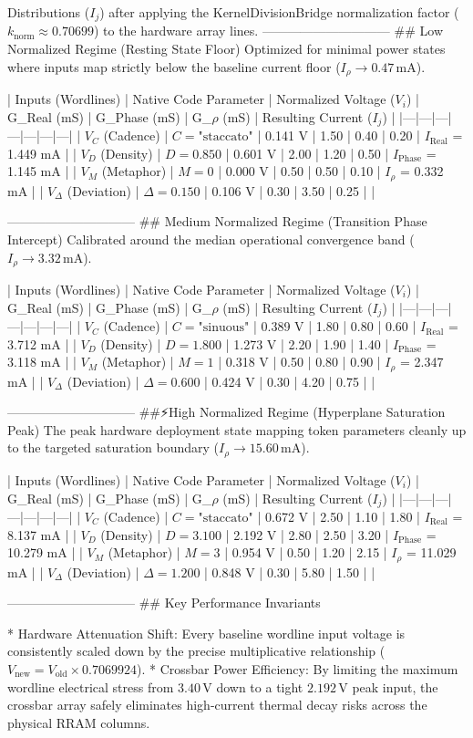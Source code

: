Distributions ($I_j$) after applying the KernelDivisionBridge normalization factor ($k_{\text{norm}} \approx 0.70699$) to the hardware array lines.
------------------------------
## Low Normalized Regime (Resting State Floor)
Optimized for minimal power states where inputs map strictly below the baseline current floor ($I_{\rho} \to 0.47\,\text{mA}$).

| Inputs (Wordlines) | Native Code Parameter | Normalized Voltage ($V_i$) | G_Real (mS) | G_Phase (mS) | G_$\rho$ (mS) | Resulting Current ($I_j$) |
|---|---|---|---|---|---|---|
| $V_C$ (Cadence) | $C = \text{"staccato"}$ | 0.141 V | 1.50 | 0.40 | 0.20 | $I_{\text{Real}}$ = 1.449 mA |
| $V_D$ (Density) | $D = 0.850$ | 0.601 V | 2.00 | 1.20 | 0.50 | $I_{\text{Phase}}$ = 1.145 mA |
| $V_M$ (Metaphor) | $M = 0$ | 0.000 V | 0.50 | 0.50 | 0.10 | $I_{\rho}$ = 0.332 mA |
| $V_\Delta$ (Deviation) | $\Delta = 0.150$ | 0.106 V | 0.30 | 3.50 | 0.25 | |

------------------------------
## Medium Normalized Regime (Transition Phase Intercept)
Calibrated around the median operational convergence band ($I_{\rho} \to 3.32\,\text{mA}$).

| Inputs (Wordlines) | Native Code Parameter | Normalized Voltage ($V_i$) | G_Real (mS) | G_Phase (mS) | G_$\rho$ (mS) | Resulting Current ($I_j$) |
|---|---|---|---|---|---|---|
| $V_C$ (Cadence) | $C = \text{"sinuous"}$ | 0.389 V | 1.80 | 0.80 | 0.60 | $I_{\text{Real}}$ = 3.712 mA |
| $V_D$ (Density) | $D = 1.800$ | 1.273 V | 2.20 | 1.90 | 1.40 | $I_{\text{Phase}}$ = 3.118 mA |
| $V_M$ (Metaphor) | $M = 1$ | 0.318 V | 0.50 | 0.80 | 0.90 | $I_{\rho}$ = 2.347 mA |
| $V_\Delta$ (Deviation) | $\Delta = 0.600$ | 0.424 V | 0.30 | 4.20 | 0.75 | |

------------------------------
##⚡️High Normalized Regime (Hyperplane Saturation Peak)
The peak hardware deployment state mapping token parameters cleanly up to the targeted saturation boundary ($I_{\rho} \to 15.60\,\text{mA}$).

| Inputs (Wordlines) | Native Code Parameter | Normalized Voltage ($V_i$) | G_Real (mS) | G_Phase (mS) | G_$\rho$ (mS) | Resulting Current ($I_j$) |
|---|---|---|---|---|---|---|
| $V_C$ (Cadence) | $C = \text{"staccato"}$ | 0.672 V | 2.50 | 1.10 | 1.80 | $I_{\text{Real}}$ = 8.137 mA |
| $V_D$ (Density) | $D = 3.100$ | 2.192 V | 2.80 | 2.50 | 3.20 | $I_{\text{Phase}}$ = 10.279 mA |
| $V_M$ (Metaphor) | $M = 3$ | 0.954 V | 0.50 | 1.20 | 2.15 | $I_{\rho}$ = 11.029 mA |
| $V_\Delta$ (Deviation) | $\Delta = 1.200$ | 0.848 V | 0.30 | 5.80 | 1.50 | |

------------------------------
## Key Performance Invariants

* Hardware Attenuation Shift: Every baseline wordline input voltage is consistently scaled down by the precise multiplicative relationship ($V_{\text{new}} = V_{\text{old}} \times 0.7069924$).
* Crossbar Power Efficiency: By limiting the maximum wordline electrical stress from $3.40\,\text{V}$ down to a tight $2.192\,\text{V}$ peak input, the crossbar array safely eliminates high-current thermal decay risks across the physical RRAM columns.
